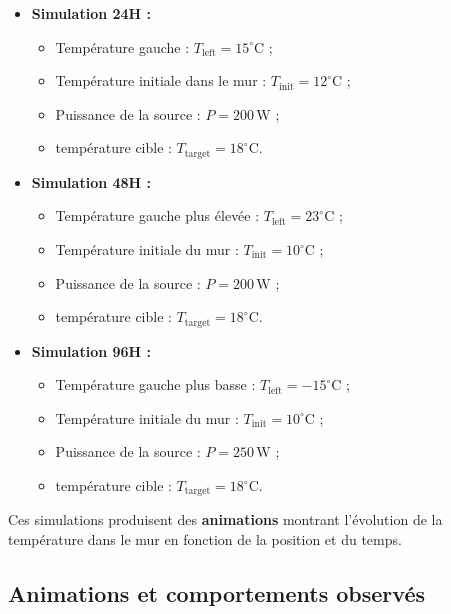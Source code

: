 \documentclass[a4paper,11pt]{article}
\begin{document}
\begin{itemize}
    \item \textbf{Simulation 24H :} 
    \begin{itemize}
        \item Température gauche : \(T_{\text{left}} = 15^\circ\mathrm{C}\) ;
        \item Température initiale dans le mur : \(T_{\text{init}} = 12^\circ\mathrm{C}\) ;
        \item Puissance de la source : \(P = 200\,\mathrm{W}\) ;
        \item température cible : \(T_{\text{target}} = 18^\circ\mathrm{C}\).
    \end{itemize}
    \item \textbf{Simulation 48H :} 
    \begin{itemize}
        \item Température gauche plus élevée : \(T_{\text{left}} = 23^\circ\mathrm{C}\) ;
        \item Température initiale du mur : \(T_{\text{init}} = 10^\circ\mathrm{C}\) ; 
        \item Puissance de la source : \(P = 200\,\mathrm{W}\) ;
        \item température cible : \(T_{\text{target}} = 18^\circ\mathrm{C}\).
    \end{itemize}

    \item \textbf{Simulation 96H :}
    \begin{itemize}
        \item Température gauche plus basse : \(T_{\text{left}} = -15^\circ\mathrm{C}\) ;
        \item Température initiale du mur : \(T_{\text{init}} = 10^\circ\mathrm{C}\) ; 
        \item Puissance de la source : \(P = 250\,\mathrm{W}\) ;
        \item température cible :  \(T_{\text{target}} = 18^\circ\mathrm{C}\).
    \end{itemize}
\end{itemize}

Ces simulations produisent des \textbf{animations} montrant l'évolution de la température dans le mur en fonction de la position et du temps.
\newpage
\subsection{Animations et comportements observés}
\end{document}
